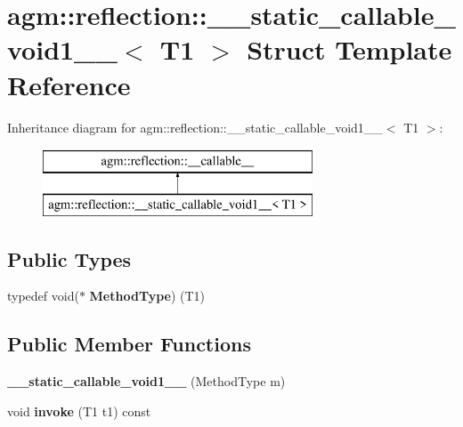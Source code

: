 \hypertarget{structagm_1_1reflection_1_1____static__callable__void1____}{}\section{agm\+:\+:reflection\+:\+:\+\_\+\+\_\+static\+\_\+callable\+\_\+void1\+\_\+\+\_\+$<$ T1 $>$ Struct Template Reference}
\label{structagm_1_1reflection_1_1____static__callable__void1____}
Inheritance diagram for agm\+:\+:reflection\+:\+:\+\_\+\+\_\+static\+\_\+callable\+\_\+void1\+\_\+\+\_\+$<$ T1 $>$\+:\begin{figure}[H]
\begin{center}
\leavevmode
\includegraphics[height=2.000000cm]{structagm_1_1reflection_1_1____static__callable__void1____}
\end{center}
\end{figure}
\subsection*{Public Types}
\begin{DoxyCompactItemize}
\item 
typedef void($\ast$ {\bfseries Method\+Type}) (T1)\hypertarget{structagm_1_1reflection_1_1____static__callable__void1_____a32bb4be425c88d1a855488c894f09b64}{}\label{structagm_1_1reflection_1_1____static__callable__void1_____a32bb4be425c88d1a855488c894f09b64}

\end{DoxyCompactItemize}
\subsection*{Public Member Functions}
\begin{DoxyCompactItemize}
\item 
{\bfseries \+\_\+\+\_\+static\+\_\+callable\+\_\+void1\+\_\+\+\_\+} (Method\+Type m)\hypertarget{structagm_1_1reflection_1_1____static__callable__void1_____a9bab589c771fc03376145e5293eba756}{}\label{structagm_1_1reflection_1_1____static__callable__void1_____a9bab589c771fc03376145e5293eba756}

\item 
void {\bfseries invoke} (T1 t1) const \hypertarget{structagm_1_1reflection_1_1____static__callable__void1_____affa5c28915b97d517554d6bf09358c47}{}\label{structagm_1_1reflection_1_1____static__callable__void1_____affa5c28915b97d517554d6bf09358c47}

\end{DoxyCompactItemize}
